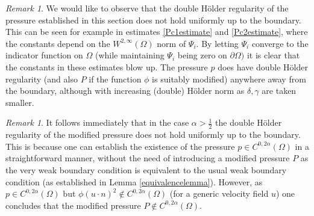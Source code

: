 \documentclass[12pt,a4paper]{article}
\theoremstyle{definition}
\theoremstyle{remark}
\newtheorem{remark}[theorem]{Remark}
\numberwithin{equation}{section}
\begin{document}
\begin{remark}
We would like to observe that the double Hölder regularity of the pressure established in this section does not hold uniformly up to the boundary. This can be seen for example in estimates \eqref{Pc1estimate} and \eqref{Pc2estimate}, where the constants depend on the $W^{2,\infty} (\Omega)$ norm of $\Psi_i$. By letting $\Psi_i$ converge to the indicator function on $\Omega$ (while maintaining $\Psi_i$ being zero on $\partial \Omega)$ it is clear that the constants in these estimates blow up. The pressure $p$ does have double Hölder regularity (and also $P$ if the function $\phi$ is suitably modified) anywhere away from the boundary, although with increasing (double) Hölder norm as $\delta, \gamma$ are taken smaller. 
\end{remark}
\begin{remark}
It follows immediately that in the case $\alpha > \frac{1}{2}$ the double Hölder regularity of the modified pressure does not hold uniformly up to the boundary. This is because one can establish the existence of the pressure $p \in C^{0,2 \alpha} (\Omega)$ in a straightforward manner, without the need of introducing a modified pressure $P$ as the very weak boundary condition is equivalent to the usual weak boundary condition (as established in Lemma \ref{equivalencelemma}). However, as $p \in C^{0,2 \alpha} (\Omega)$ but $\phi (u \cdot n)^2 \notin C^{0,2 \alpha} (\Omega)$ (for a generic velocity field $u$) one concludes that the modified pressure $P \notin C^{0,2 \alpha} (\Omega)$.
\end{remark}
\end{document}
